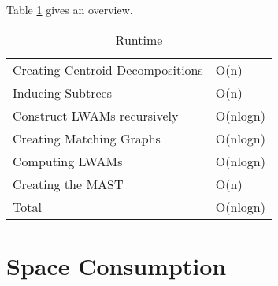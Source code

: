 Table \ref{runtimeTable} gives an overview.
\begin{table}[]
	\centering
	\begin{tabular}{l|l}
		Creating Centroid Decompositions & O(n)     \\
		Inducing Subtrees                & O(n)     \\
		Construct LWAMs recursively		 & O(nlogn) \\
		Creating Matching Graphs         & O(nlogn) \\
		Computing LWAMs                  & O(nlogn) \\
		Creating the MAST                & O(n)     \\ \hline
		Total                            & O(nlogn)
	\end{tabular}
	\caption{Runtime}
	\label{runtimeTable}
\end{table}

\section{Space Consumption}











